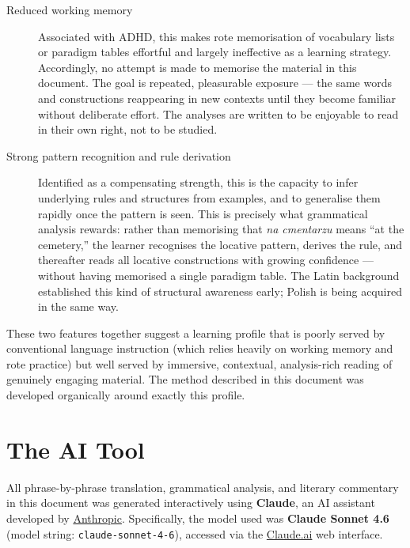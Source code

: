 \begin{description}

  \item[Reduced working memory] Associated with ADHD, this makes
    rote memorisation of vocabulary lists or paradigm tables
    effortful and largely ineffective as a learning strategy.
    Accordingly, no attempt is made to memorise the material in
    this document. The goal is repeated, pleasurable exposure ---
    the same words and constructions reappearing in new contexts
    until they become familiar without deliberate effort.
    The analyses are written to be enjoyable to read in their own
    right, not to be studied.

  \item[Strong pattern recognition and rule derivation] Identified
    as a compensating strength, this is the capacity to infer
    underlying rules and structures from examples, and to
    generalise them rapidly once the pattern is seen. This is
    precisely what grammatical analysis rewards: rather than
    memorising that \textit{na cmentarzu} means ``at the cemetery,''
    the learner recognises the locative pattern, derives the rule,
    and thereafter reads all locative constructions with growing
    confidence --- without having memorised a single paradigm table.
    The Latin background established this kind of structural
    awareness early; Polish is being acquired in the same way.

\end{description}

These two features together suggest a learning profile that is
poorly served by conventional language instruction (which relies
heavily on working memory and rote practice) but well served by
immersive, contextual, analysis-rich reading of genuinely engaging
material. The method described in this document was developed
organically around exactly this profile.

\section*{The AI Tool}

All phrase-by-phrase translation, grammatical analysis, and literary
commentary in this document was generated interactively using
\textbf{Claude}, an AI assistant developed by
\href{https://www.anthropic.com}{Anthropic}. Specifically, the model
used was \textbf{Claude Sonnet 4.6}
(model string: \texttt{claude-sonnet-4-6}), accessed via the
\href{https://claude.ai}{Claude.ai} web interface.

